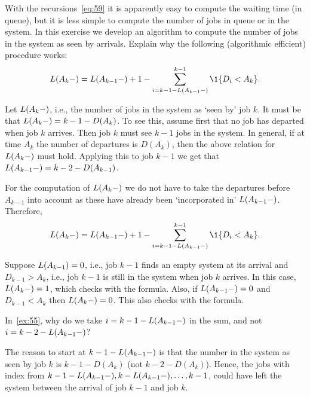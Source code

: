 \begin{exercise}\label{ex:55}
  With the recursions~\cref{eq:59} it is apparently easy to compute the waiting time (in queue), but it is less simple to compute the number of jobs in queue or in the system.
  In this exercise we develop an algorithm to compute the number of jobs in the system as seen by arrivals.  Explain why the following (algorithmic efficient) procedure works:
 \begin{equation*}
 \L(A_k-) = \L(A_{k-1}-)+1 - \sum_{i= k-1 - \L(A_{k-1}-)}^{k-1} \1{D_i< A_k}.
 \end{equation*}
\begin{solution}
 Let $ L(A_{k}-)$, i.e., the number of jobs in the system as
 `seen by' job $k$. It must be that $L(A_{k}-)=k-1 - D(A_{k})$. To see
 this, assume first that no job has departed when job $k$
 arrives. Then job $k$ must see $k-1$ jobs in the system. In general,
 if at time $A_k$ the number of departures is $D(A_k)$, then the
 above relation for $L(A_k-)$ must hold. Applying this to job $k-1$ we get that $L(A_{k-1}-) = k-2 - D(A_{k-1})$.

 For the computation of $L(A_k-)$ we do not have to take the departures
 before $A_{k-1}$ into account as these have already been
 `incorporated in' $L(A_{k-1}-)$. Therefore,
 \begin{equation*}
 \L(A_k-) = \L(A_{k-1}-) + 1 - \sum_{i= k-1 - \L(A_{k-1}-)}^{k-1} \1{D_i< A_k}.
 \end{equation*}

 Suppose $L(A_{k-1})=0$, i.e., job $k-1$ finds an empty system at its
 arrival and $D_{k-1}>A_{k}$, i.e., job $k-1$ is still in the
 system when job $k$ arrives. In this case, $L(A_{k}-)=1$, which checks
 with the formula. Also, if $L(A_{k-1}-)=0$ and $D_{k-1}< A_k$ then
 $L(A_k-) = 0$. This also checks with the formula.

\end{solution}
\end{exercise}


\begin{exercise}
 In~\cref{ex:55}, why do we take $i=k-1-L(A_{k-1}-)$ in the sum, and not $i=k-2-L(A_{k-1}-)$?
\begin{solution}
 The reason to start at $k-1-L(A_{k-1}-)$ is that the number in the
 system as seen by job $k$ is $k-1 - D(A_k)$ (not
 $k-2-D(A_k)$). Hence, the jobs with index from
 $k-1-L(A_{k-1}-), k-L(A_{k-1}-), \ldots, k-1$, could have left the system
 between the arrival of job $k-1$ and job $k$.
\end{solution}
\end{exercise}






